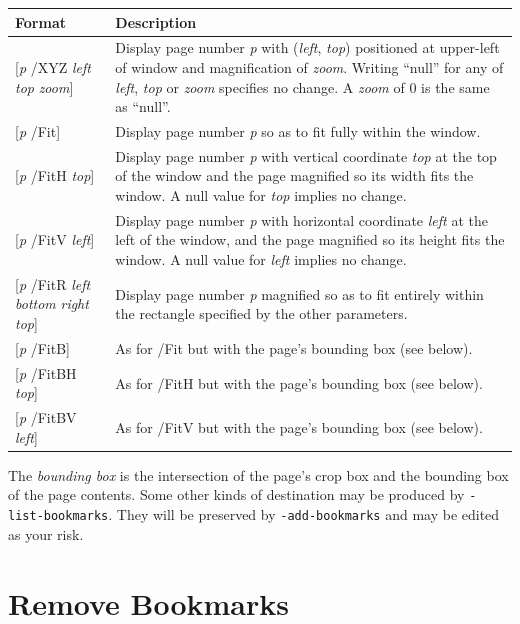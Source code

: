 \documentclass{book}
\begin{document}
\medskip

\begin{tabular}{lp{8cm}}
Format & Description\\\hline
{[\textit{p} /XYZ \textit{left} \textit{top} \textit{zoom}]} & Display page number \textit{p} with (\textit{left}, \textit{top}) positioned at upper-left of window and magnification of \textit{zoom}. Writing ``null'' for any of \textit{left}, \textit{top} or \textit{zoom} specifies no change. A \textit{zoom} of 0 is the same as ``null''.\\
{[\textit{p} /Fit]} & Display page number \textit{p} so as to fit fully within the window.\\
{[\textit{p} /FitH \textit{top}]} & Display page number \textit{p} with vertical coordinate \textit{top} at the top of the window and the page magnified so its width fits the window. A null value for \textit{top} implies no change.\\
{[\textit{p} /FitV \textit{left}]} & Display page number \textit{p} with horizontal coordinate \textit{left} at the left of the window, and the page magnified so its height fits the window. A null value for \textit{left} implies no change. \\
{[\textit{p} /FitR \textit{left} \textit{bottom} \textit{right} \textit{top}]} & Display page number \textit{p} magnified so as to fit entirely within the rectangle specified by the other parameters. \\
{[\textit{p} /FitB]} & As for /Fit but with the page's bounding box (see below).\\
{[\textit{p} /FitBH \textit{top}]} & As for /FitH but with the page's bounding box (see below).\\
{[\textit{p} /FitBV \textit{left}]} & As for /FitV but with the page's bounding box (see below).
\end{tabular}

\medskip

\noindent The \textit{bounding box} is the intersection of the page's crop box and the bounding box of the page contents. Some other kinds of destination may be produced by \texttt{-list-bookmarks}. They will be preserved by \texttt{-add-bookmarks} and may be edited as your risk.


  \section{Remove Bookmarks}
  \label{removebookmarks}
\end{document}
